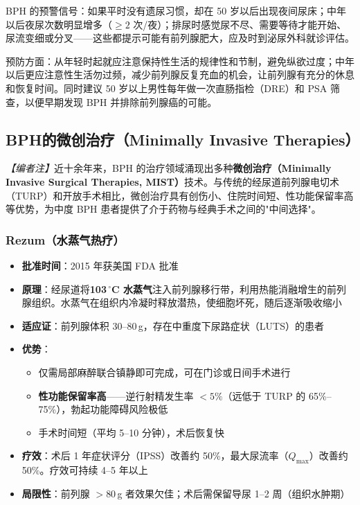 \begin{tcolorbox}[colback=pink!5!white,colframe=red!50~50!black,title=贴心小叮咛]
BPH 的预警信号：如果平时没有遗尿习惯，却在 50 岁以后出现夜间尿床；中年以后夜尿次数明显增多（$\geq2$ 次/夜）；排尿时感觉尿不尽、需要等待才能开始、尿流变细或分叉——这些都提示可能有前列腺肥大，应及时到泌尿外科就诊评估。

预防方面：从年轻时起就应注意保持性生活的规律性和节制，避免纵欲过度；中年以后更应注意性生活勿过频，减少前列腺反复充血的机会，让前列腺有充分的休息和恢复时间。同时建议 50 岁以上男性每年做一次直肠指检（DRE）和 PSA 筛查，以便早期发现 BPH 并排除前列腺癌的可能。
\end{tcolorbox}

\subsection{BPH的微创治疗（Minimally Invasive Therapies）}
\label{subsec:bph_minitreatment}

\noindent\textit{【编者注】}近十余年来，BPH 的治疗领域涌现出多种\textbf{微创治疗（Minimally Invasive Surgical Therapies, MIST）}技术。与传统的经尿道前列腺电切术（TURP）和开放手术相比，微创治疗具有创伤小、住院时间短、性功能保留率高等优势，为中度 BPH 患者提供了介于药物与经典手术之间的"中间选择"。

\subsubsection{Rezum（水蒸气热疗）}

\begin{itemize}[leftmargin=2cm]
	\item \textbf{批准时间}：2015 年获美国 FDA 批准
	\item \textbf{原理}：经尿道将\textbf{103\,$^\circ$C 水蒸气}注入前列腺移行带，利用热能消融增生的前列腺组织。水蒸气在组织内冷凝时释放潜热，使细胞坏死，随后逐渐吸收缩小
	\item \textbf{适应证}：前列腺体积 30--80\,g，存在中重度下尿路症状（LUTS）的患者
	\item \textbf{优势}：
	\begin{itemize}
		\item 仅需局部麻醉联合镇静即可完成，可在门诊或日间手术进行
		\item \textbf{性功能保留率高}——逆行射精发生率 $<5\%$（远低于 TURP 的 65\%--75\%），勃起功能障碍风险极低
		\item 手术时间短（平均 5--10 分钟），术后恢复快
	\end{itemize}
	\item \textbf{疗效}：术后 1 年症状评分（IPSS）改善约 50\%，最大尿流率（$Q_{\max}$）改善约 50\%。疗效可持续 4--5 年以上
	\item \textbf{局限性}：前列腺 $>80$\,g 者效果欠佳；术后需保留导尿 1--2 周（组织水肿期）
\end{itemize}

